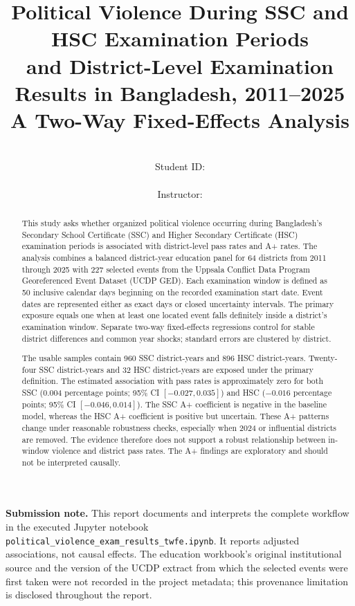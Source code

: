 \documentclass[11pt]{article}
\title{\textbf{Political Violence During SSC and HSC Examination Periods\\
and District-Level Examination Results in Bangladesh, 2011--2025}\\[0.5em]
\large A Two-Way Fixed-Effects Analysis}
\author{\studentname\\Student ID: \studentid\\\coursename\\Instructor: \instructorname}
\date{\submissiondate}
\begin{document}
\maketitle
\thispagestyle{empty}
\vfill
\begin{center}
\begin{minipage}{0.88\textwidth}
\small
\textbf{Submission note.} This report documents and interprets the complete workflow in the executed Jupyter notebook \texttt{political\_violence\_exam\_results\_twfe.ipynb}. It reports adjusted associations, not causal effects. The education workbook's original institutional source and the version of the UCDP extract from which the selected events were first taken were not recorded in the project metadata; this provenance limitation is disclosed throughout the report.
\end{minipage}
\end{center}
\vfill
\clearpage

\begin{abstract}
This study asks whether organized political violence occurring during Bangladesh's Secondary School Certificate (SSC) and Higher Secondary Certificate (HSC) examination periods is associated with district-level pass rates and A+ rates. The analysis combines a balanced district-year education panel for 64 districts from 2011 through 2025 with 227 selected events from the Uppsala Conflict Data Program Georeferenced Event Dataset (UCDP GED). Each examination window is defined as 50 inclusive calendar days beginning on the recorded examination start date. Event dates are represented either as exact days or closed uncertainty intervals. The primary exposure equals one when at least one located event falls definitely inside a district's examination window. Separate two-way fixed-effects regressions control for stable district differences and common year shocks; standard errors are clustered by district.

The usable samples contain 960 SSC district-years and 896 HSC district-years. Twenty-four SSC district-years and 32 HSC district-years are exposed under the primary definition. The estimated association with pass rates is approximately zero for both SSC (0.004 percentage points; 95\% CI $[-0.027, 0.035]$) and HSC ($-0.016$ percentage points; 95\% CI $[-0.046, 0.014]$). The SSC A+ coefficient is negative in the baseline model, whereas the HSC A+ coefficient is positive but uncertain. These A+ patterns change under reasonable robustness checks, especially when 2024 or influential districts are removed. The evidence therefore does not support a robust relationship between in-window violence and district pass rates. The A+ findings are exploratory and should not be interpreted causally.
\end{abstract}
\end{document}
